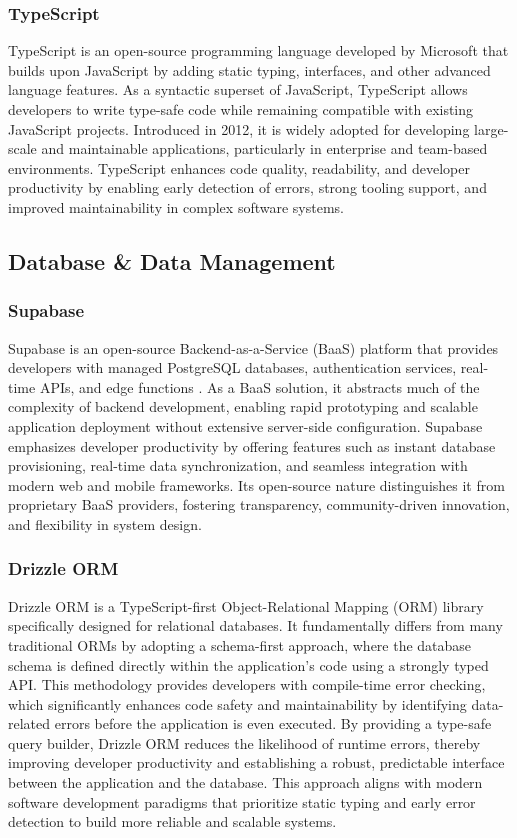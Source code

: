 \subsubsection{TypeScript}
TypeScript \cite{appiness2025typescript} is an open-source programming language developed by Microsoft that builds upon JavaScript by adding static typing, interfaces, and other advanced language features. As a syntactic superset of JavaScript, TypeScript allows developers to write type-safe code while remaining compatible with existing JavaScript projects. Introduced in 2012, it is widely adopted for developing large-scale and maintainable applications, particularly in enterprise and team-based environments. TypeScript enhances code quality, readability, and developer productivity by enabling early detection of errors, strong tooling support, and improved maintainability in complex software systems.

\subsection{Database \& Data Management}
\subsubsection{Supabase}
Supabase is an open-source Backend-as-a-Service (BaaS) platform that provides developers with managed PostgreSQL databases, authentication services, real-time APIs, and edge functions \cite{supabase2025architecture}. As a BaaS solution, it abstracts much of the complexity of backend development, enabling rapid prototyping and scalable application deployment without extensive server-side configuration. Supabase emphasizes developer productivity by offering features such as instant database provisioning, real-time data synchronization, and seamless integration with modern web and mobile frameworks. Its open-source nature distinguishes it from proprietary BaaS providers, fostering transparency, community-driven innovation, and flexibility in system design. 

\subsubsection{Drizzle ORM}
Drizzle ORM \cite{drizzle2025overview} is a TypeScript-first Object-Relational Mapping (ORM) library specifically designed for relational databases. It fundamentally differs from many traditional ORMs by adopting a schema-first approach, where the database schema is defined directly within the application's code using a strongly typed API. This methodology provides developers with compile-time error checking, which significantly enhances code safety and maintainability by identifying data-related errors before the application is even executed. By providing a type-safe query builder, Drizzle ORM reduces the likelihood of runtime errors, thereby improving developer productivity and establishing a robust, predictable interface between the application and the database. This approach aligns with modern software development paradigms that prioritize static typing and early error detection to build more reliable and scalable systems.

